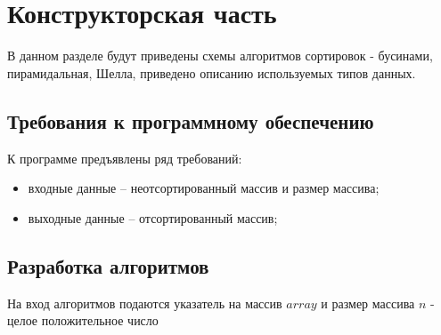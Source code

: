 \chapter{Конструкторская часть}

В данном разделе будут приведены схемы алгоритмов сортировок - бусинами, пирамидальная, Шелла, приведено описанию используемых типов данных.

\section{Требования к программному обеспечению}

К программе предъявлены ряд требований:

\begin{itemize}
	\item входные данные -- неотсортированный массив и размер массива;
	\item выходные данные -- отсортированный массив;
\end{itemize}

\section{Разработка алгоритмов}

На вход алгоритмов подаются указатель на массив $array$ и размер массива $n$ - целое положительное число


